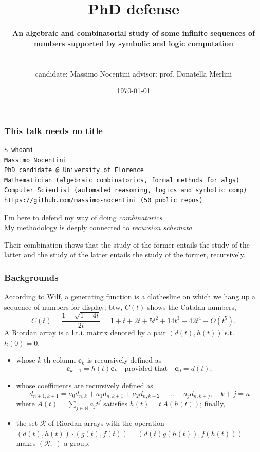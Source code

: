 \documentclass[9pt]{beamer}
\title{PhD defense}
\author{\textbf{An algebraic and combinatorial study\newline
        of some infinite sequences of numbers\newline
        supported by symbolic and logic computation}\\\\\\
{\small candidate:} Massimo Nocentini \hfill {\small advisor:} prof. Donatella Merlini }
\institute{University of Florence, Italy.}
\date{\today}
\begin{document}
\frame{\titlepage}


\begin{frame}[fragile]
\frametitle{This talk needs no title}
\begin{Verbatim}
$ whoami
Massimo Nocentini
PhD candidate @ University of Florence
Mathematician (algebraic combinatorics, formal methods for algs)
Computer Scientist (automated reasoning, logics and symbolic comp)
https://github.com/massimo-nocentini (50 public repos)
\end{Verbatim}

\begin{block}{}
I'm here to defend my way of doing \textit{combinatorics}. \\
My methodology is deeply connected to \textit{recursion schemata}.

Their combination shows that the study of the former entails the study of the
latter and the study of the latter entails the study of the former,
recursively.
\end{block}
\end{frame}

\begin{frame}[fragile]
\frametitle{Backgrounds}
According to Wilf, a
generating function is a clothesline on which we hang up a sequence of
numbers for display; btw, $C(t)$ shows the Catalan numbers,
\begin{displaymath}
 C(t) = \frac{1-\sqrt{1-4t}}{2t} = 1 + t + 2t + 5t^{2} + 14t^{3} + 42t^{4} + O(t^{5}).
\end{displaymath}
A Riordan array is a l.t.i. matrix denoted by a pair $(d(t), h(t))$ s.t. $h(0)=0$, 
\begin{itemize}
\item whose $k$-th column $\textbf{c}_{k}$ is recursively defined as 
\begin{displaymath}
 \textbf{c}_{k+1} =h(t) \textbf{c}_{k} \quad\text{provided that}\quad \textbf{c}_{0} = d(t) ;
\end{displaymath}
\item whose coefficients are recursively defined as
\begin{displaymath}
 d_{n+1, k+1} = a_{0}d_{n, k} + a_{1}d_{n, k+1} + a_{2}d_{n, k+2} + \ldots + a_{j}d_{n, k + j}, \quad k + j = n
\end{displaymath}
where $A(t) = \sum_{j\in\mathbb{N}}{a_{j}t^{j}}$ satisfies $h(t) = t\,A(h(t))$; finally,
\item the set $\mathcal{R}$ of Riordan arrays with the
operation $(d(t), h(t))\cdot(g(t), f(t)) = (d(t)g(h(t)), f(h(t)))$
makes $(\mathcal{R}, \cdot)$ a group.
\end{itemize}


\end{frame}
\end{document}
